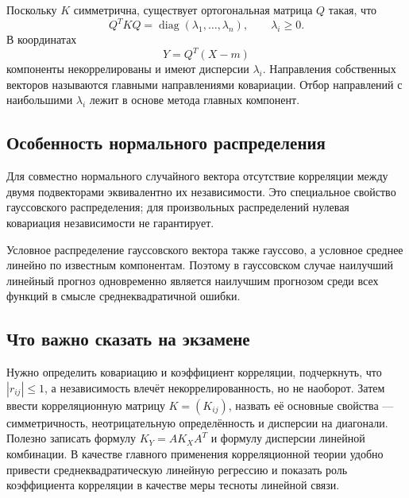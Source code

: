 Поскольку $K$ симметрична, существует ортогональная матрица $Q$ такая, что
\[
    Q^TKQ=\operatorname{diag}(\lambda_1,\ldots,\lambda_n),
    \qquad \lambda_i\ge0.
\]
В координатах
\[
    Y=Q^T(X-m)
\]
компоненты некоррелированы и имеют дисперсии $\lambda_i$. Направления собственных
векторов называются главными направлениями ковариации. Отбор направлений с
наибольшими $\lambda_i$ лежит в основе метода главных компонент.

\subsection{Особенность нормального распределения}

Для совместно нормального случайного вектора отсутствие корреляции между двумя
подвекторами эквивалентно их независимости. Это специальное свойство гауссовского
распределения; для произвольных распределений нулевая ковариация независимости не
гарантирует.

Условное распределение гауссовского вектора также гауссово, а условное среднее
линейно по известным компонентам. Поэтому в гауссовском случае наилучший линейный
прогноз одновременно является наилучшим прогнозом среди всех функций в смысле
среднеквадратичной ошибки.

\subsection{Что важно сказать на экзамене}

Нужно определить ковариацию и коэффициент корреляции, подчеркнуть, что
$|r_{ij}|\leq1$, а независимость влечёт некоррелированность, но не наоборот.
Затем ввести корреляционную матрицу $K=(K_{ij})$, назвать её основные свойства
--- симметричность, неотрицательную определённость и дисперсии на диагонали.
Полезно записать формулу $K_Y=AK_XA^T$ и формулу дисперсии линейной комбинации.
В качестве главного применения корреляционной теории удобно привести
среднеквадратическую линейную регрессию и показать роль коэффициента
корреляции в качестве меры тесноты линейной связи.

\newpage

